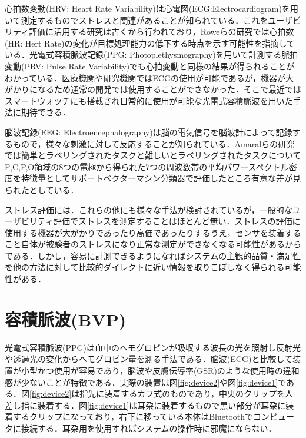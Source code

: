 心拍数変動(HRV: Heart Rate Variability)は心電図(ECG:Electrocardiogram)を用いて測定するものでストレスと関連があることが知られている．これをユーザビリティ評価に活用する研究は古くから行われており，Roweらの研究では心拍数(HR: Hert Rate)の変化が目標処理能力の低下する時点を示す可能性を指摘している\cite{hrv1998}．光電式容積脈波記録(PPG: Photoplethysmography)を用いて計測する脈拍変動(PRV: Pulse Rate Variability)でも心拍変動と同様の結果が得られることがわかっている\cite{ppg}．医療機関や研究機関ではECGの使用が可能であるが，機器が大がかりになるため通常の開発では使用することができなかった．そこで最近ではスマートウォッチにも搭載され日常的に使用が可能な光電式容積脈波を用いた手法に期待できる．

脳波記録(EEG: Electroencephalography)は脳の電気信号を脳波計によって記録するもので，様々な刺激に対して反応することが知られている．Amaralらの研究では簡単とラベリングされたタスクと難しいとラベリングされたタスクについてF,C,P,O領域の8つの電極から得られた7つの周波数帯の平均パワースペクトル密度を特徴量としてサポートベクターマシン分類器で評価したところ有意な差が見られたとしている\cite{eeg}．

ストレス評価には．これらの他にも様々な手法が検討されているが，一般的なユーザビリティ評価でストレスを測定することはほとんど無い．ストレスの評価に使用する機器が大がかりであったり高価であったりするうえ，センサを装着すること自体が被験者のストレスになり正常な測定ができなくなる可能性があるからである\cite{tullis2014}．しかし，容易に計測できるようになればシステムの主観的品質・満足性を他の方法に対して比較的ダイレクトに近い情報を取りこぼしなく得られる可能性がある．

\section{容積脈波(BVP)}

光電式容積脈波(PPG)は血中のヘモグロビンが吸収する波長の光を照射し反射光や透過光の変化からヘモグロビン量を測る手法である\cite{pulseoximeter}．脳波(ECG)と比較して装置が小型かつ使用が容易であり，脳波や皮膚伝導率(GSR)のような使用時の違和感が少ないことが特徴である．実際の装置は図\ref{fig:device2}や図\ref{fig:device1}である．図\ref{fig:device2}は指先に装着するカフ式のものであり，中央のクリップを人差し指に装着する．図\ref{fig:device1}は耳朶に装着するもので黒い部分が耳朶に装着するクリップになっており，右下に移っている本体はBluetoothでコンピュータに接続する．耳朶用を使用すればシステムの操作時に邪魔にならない．

